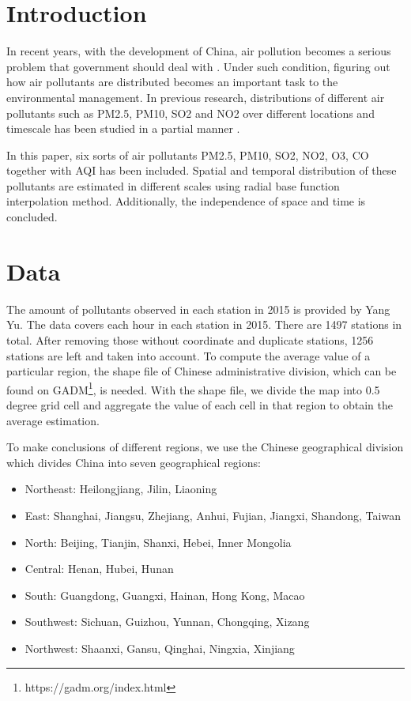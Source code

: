 \documentclass[letterpaper]{article}
\begin{document}
\begin{CJK*}{UTF8}{gkai}
\section{Introduction}
In recent years, with the development of China, air pollution becomes a serious problem that government should deal with . Under such condition, figuring out how air pollutants are distributed becomes an important task to the environmental management. In previous research, distributions of different air pollutants such as PM2.5, PM10, SO2 and NO2 over different locations and timescale has been studied in a partial manner .

In this paper, six sorts of air pollutants PM2.5, PM10, SO2, NO2, O3, CO together with AQI has been included. Spatial and temporal distribution of these pollutants are estimated in different scales using radial base function interpolation method. Additionally, the independence of space and time is concluded. 

\section{Data}

The amount of pollutants observed in each station in 2015 is provided by Yang Yu. The data covers each hour in each station in 2015. There are 1497 stations in total. After removing those without coordinate and duplicate stations, 1256 stations are left and taken into account. To compute the average value of a particular region, the shape file of Chinese administrative division, which can be found on GADM\footnote{https://gadm.org/index.html}, is needed. With the shape file, we divide the map into 0.5 degree grid cell and aggregate the value of each cell in that region to obtain the average estimation.

To make conclusions of different regions, we use the Chinese geographical division which divides China into seven geographical regions:
\begin{itemize}
\item Northeast: Heilongjiang, Jilin, Liaoning
\item East: Shanghai, Jiangsu, Zhejiang, Anhui, Fujian, Jiangxi, Shandong, Taiwan
\item North: Beijing, Tianjin, Shanxi, Hebei, Inner Mongolia
\item Central: Henan, Hubei, Hunan
\item South: Guangdong, Guangxi, Hainan, Hong Kong, Macao
\item Southwest: Sichuan, Guizhou, Yunnan, Chongqing, Xizang
\item Northwest: Shaanxi, Gansu, Qinghai, Ningxia, Xinjiang
\end{itemize}


\end{CJK*}
\end{document}
